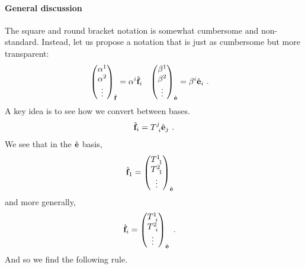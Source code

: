 \documentclass[12pt, oneside]{report}    %
\begin{document}
\paragraph{General discussion} The square and round bracket notation is somewhat cumbersome and non-standard. Instead, let us propose a notation that is just as cumbersome but more transparent:
\begin{align}
    \begin{pmatrix}
        \alpha^1\\
        \alpha^2\\
        \vdots
    \end{pmatrix}_{\hat{\mathbf{f}}}
    &= \alpha^i \hat{\mathbf{f}}_i
    &
    \begin{pmatrix}
        \beta^1\\
        \beta^2\\
        \vdots
    \end{pmatrix}_{\hat{\mathbf{e}}}
    &= \beta^i \hat{\mathbf{e}}_i \ .
\end{align}
A key idea is to see how we convert between bases.
\begin{align}
    \bas{f}_i = T\aij{j}{i} \bas{e}_j \ .
    \label{eq:change:of:basis:matrix:1}
\end{align}
We see that in the $\hat{\mathbf{e}}$ basis,
\begin{align}
    \bas{f}_1 &=
    \begin{pmatrix}
        T\aij{1}{1}
        \\
        T\aij{2}{1}
        \\
        \vdots
    \end{pmatrix}_{\bas{e}}
\end{align}
and more generally,
\begin{align}
    \bas{f}_i &=
    \begin{pmatrix}
        T\aij{1}{i}
        \\
        T\aij{2}{i}
        \\
        \vdots
    \end{pmatrix}_{\bas{e}} \ .
\end{align}
And so we find the following rule.
\end{document}
